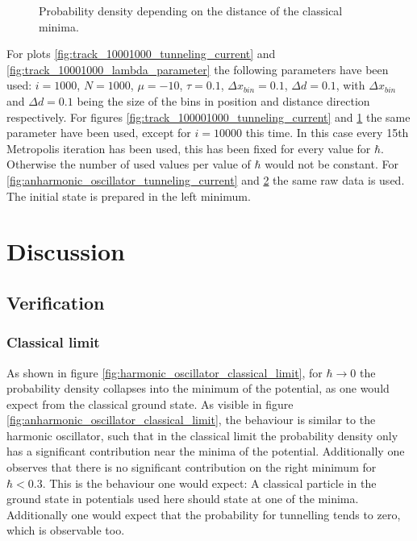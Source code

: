 \documentclass{scrartcl}
\begin{document}
\begin{figure}[H]
\begin{subfigure}[c]{0.49\textwidth}
					\label{fig:track_100001000_lambda_parameter}
				\end{subfigure}
			\caption{Probability density depending on the distance of the classical minima.}
			\label{fig:anharmonic_oscillator_lambda_parameter}
		\end{figure}
		For plots \ref{fig:track_10001000_tunneling_current} and \ref{fig:track_10001000_lambda_parameter} the following parameters have been used: $i=1000$, $N=1000$, $\mu = -10$, $\tau = 0.1$, $\Delta x_{bin} = 0.1$, $\Delta d = 0.1$, with $\Delta x_{bin}$ and $\Delta d = 0.1$ being the size of the bins in position and distance direction respectively.
		For figures \ref{fig:track_100001000_tunneling_current} and \ref{fig:track_100001000_lambda_parameter} the same parameter have been used, except for $i = 10000$ this time.
		In this case every 15th Metropolis iteration has been used, this has been fixed for every value for $\hbar$.
		Otherwise the number of used values per value of $\hbar$ would not be constant.
		For \ref{fig:anharmonic_oscillator_tunneling_current} and \ref{fig:anharmonic_oscillator_lambda_parameter} the same raw data is used.
		The initial state is prepared in the left minimum.

	\section{Discussion}
	\subsection{Verification}
	\subsubsection{Classical limit}
		As shown in figure \ref{fig:harmonic_oscillator_classical_limit}, for $\hbar \rightarrow 0$ the probability density collapses into the minimum of the potential, as one would expect from the classical ground state.
		As visible in figure \ref{fig:anharmonic_oscillator_classical_limit}, the behaviour is similar to the harmonic oscillator, such that in the classical limit the probability density only has a significant contribution near the minima of the potential.
		Additionally one observes that there is no significant contribution on the right minimum for $\hbar < 0.3$.
		This is the behaviour one would expect:
		A classical particle in the ground state in potentials used here should state at one of the minima.
		Additionally one would expect that the probability for tunnelling tends to zero, which is observable too.
\end{document}
